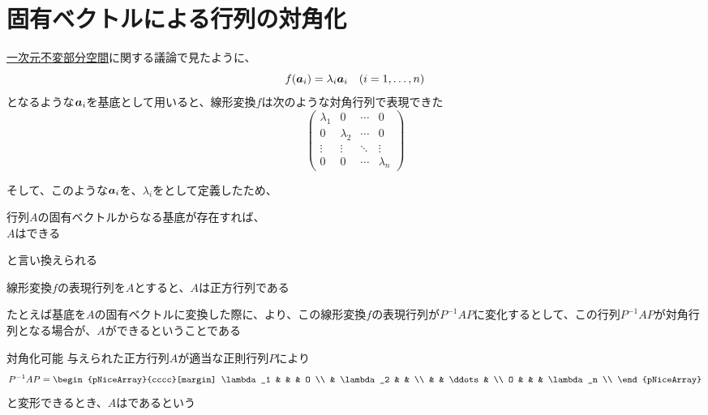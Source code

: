 \documentclass[../../../topic_linear-algebra]{subfiles}
\begin{document}
\sectionline
\section{固有ベクトルによる行列の対角化}

\hyperref[sec:1d-invariant-subspaces]{一次元不変部分空間}に関する議論で見たように、
\begin{equation*}
  f(\vb*{a}_i) = \lambda_i \vb*{a}_i \quad (i = 1, \dots, n)
\end{equation*}
となるような$\vb*{a}_i$を基底として用いると、線形変換$f$は次のような対角行列で表現できた
\begin{equation*}
  \begin{pmatrix}
    \lambda_1 & 0         & \cdots & 0         \\
    0         & \lambda_2 & \cdots & 0         \\
    \vdots    & \vdots    & \ddots & \vdots    \\
    0         & 0         & \cdots & \lambda_n
  \end{pmatrix}
\end{equation*}

そして、このような$\vb*{a}_i$を、$\lambda_i$をとして定義したため、
\begin{shaded}
  行列$A$の固有ベクトルからなる基底が存在すれば、\\
  $A$はできる
\end{shaded}
と言い換えられる

\sectionline

線形変換$f$の表現行列を$A$とすると、$A$は正方行列である

\br

たとえば基底を$A$の固有ベクトルに変換した際に、より、この線形変換$f$の表現行列が$P^{-1}AP$に変化するとして、この行列$P^{-1}AP$が対角行列となる場合が、$A$ができるということである

\begin{definition}{対角化可能}\label{def:diagonalizable}
  与えられた正方行列$A$が適当な正則行列$P$により
  \begin{equation*}
    P^{-1}AP = \begin{pNiceArray}{cccc}[margin]
      \lambda_1 & & & O \\
      & \lambda_2 & & \\
      & & \ddots & \\
      O & & & \lambda_n \\
    \end{pNiceArray}
  \end{equation*}
  と変形できるとき、$A$はであるという
\end{definition}
\end{document}

